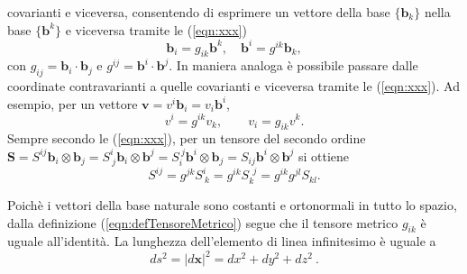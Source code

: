  covarianti e viceversa, consentendo di esprimere un vettore della base $\{ \bm{b}_k \}$ nella base $\{ \bm{b}^k \}$ e viceversa tramite le (\ref{eqn:xxx})
 \begin{equation}
\bm{b}_i = g_{ik} \bm{b}^k , \quad \bm{b}^i = g^{ik} \bm{b}_k ,
 \end{equation}
 con $g_{ij} = \bm{b}_i \cdot \bm{b}_j$ e $g^{ij} = \bm{b}^i \cdot \bm{b}^j$. In maniera analoga è possibile passare dalle coordinate contravarianti a quelle covarianti e viceversa tramite le (\ref{eqn:xxx}). Ad esempio, per un vettore $\bm{v} = v^i \bm{b}_i = v_i \bm{b}^i$, 
 \begin{equation}
  v^i = g^{ik} v_k , \qquad v_i = g_{ik} v^k .
 \end{equation}
 Sempre secondo le (\ref{eqn:xxx}), per un tensore del secondo ordine $\bm{S}= S^{ij} \bm{b}_i \otimes \bm{b}_j = 
    S^{i\ }_{\ j} \bm{b}_i \otimes \bm{b}^j =
    S^{\ j}_{i\ } \bm{b}^i \otimes \bm{b}_j = 
    S_{ij} \bm{b}^i \otimes \bm{b}^j$ si ottiene
 \begin{equation}
  S^{ij} = g^{jk} S^{i\ }_{\ k} = g^{ik} S^{\ \ j}_{k\ } = g^{ik} g^{jl} S_{kl} .
 \end{equation}
%
\begin{example}
    Poichè i vettori della base naturale sono costanti e ortonormali in tutto lo spazio, dalla definizione (\ref{eqn:defTensoreMetrico}) segue che il tensore metrico $g_{ik}$ è uguale all'identità.
 La lunghezza dell'elemento di linea infinitesimo è uguale a
\begin{equation}
    ds^2 = |d\bm{x}|^2 = dx^2 + dy^2 + dz^2 \ .
\end{equation}
\end{example}
%

